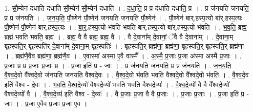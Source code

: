 \documentclass[17pt]{extarticle}
\begin{document}
1. सौ॒म्येन॑ दधाति दधाति सौ॒म्येन॑ सौ॒म्येन॑ दधाति । . द॒धा॒ति॒ प्र प्र द॑धाति दधाति॒ प्र । . प्र ज॑नयति जनयति॒ प्र प्र ज॑नयति । . ज॒न॒य॒ति॒ पौ॒ष्णेन॑ पौ॒ष्णेन॑ जनयति जनयति पौ॒ष्णेन॑ । . पौ॒ष्णेन॑ बार्.हस्प॒त्यो बा॑र्.हस्प॒त्यः पौ॒ष्णेन॑ पौ॒ष्णेन॑ बार्.हस्प॒त्यः । . बा॒र्॒.ह॒स्प॒त्यो भ॑वति भवति बार्.हस्प॒त्यो बा॑र्.हस्प॒त्यो भ॑वति । . भ॒व॒ति॒ ब्रह्म॒ ब्रह्म॑ भवति भवति॒ ब्रह्म॑ । . ब्रह्म॒ वै वै ब्रह्म॒ ब्रह्म॒ वै । . वै दे॒वाना᳚म् दे॒वानां॒ ॅवै वै दे॒वाना᳚म् । . दे॒वाना॒म् बृह॒स्पति॒र् बृह॒स्पति॑र् दे॒वाना᳚म् दे॒वाना॒म् बृह॒स्पतिः॑ । . बृह॒स्पति॒र् ब्रह्म॑णा॒ ब्रह्म॑णा॒ बृह॒स्पति॒र् बृह॒स्पति॒र् ब्रह्म॑णा । . ब्रह्म॑णै॒वैव ब्रह्म॑णा॒ ब्रह्म॑णै॒व । . ए॒वास्मा॑ अस्मा ए॒वै वास्मै᳚ । . अ॒स्मै॒ प्र॒जाः प्र॒जा अ॑स्मा अस्मै प्र॒जाः । . प्र॒जाः प्र प्र प्र॒जाः प्र॒जाः प्र । . प्र॒जा इति॑ प्र - जाः । . प्र ज॑नयति जनयति॒ प्र प्र ज॑नयति । . ज॒न॒य॒ति॒ वै॒श्व॒दे॒वो वै᳚श्वदे॒वो ज॑नयति जनयति वैश्वदे॒वः । . वै॒श्व॒दे॒वो भ॑वति भवति वैश्वदे॒वो वै᳚श्वदे॒वो भ॑वति । . वै॒श्व॒दे॒व इति॑ वैश्व - दे॒वः । . भ॒व॒ति॒ वै॒श्व॒दे॒व्यो॑ वैश्वदे॒व्यो॑ भवति भवति वैश्वदे॒व्यः॑ । . वै॒श्व॒दे॒व्यो॑ वै वै वै᳚श्वदे॒व्यो॑ वैश्वदे॒व्यो॑ वै । . वै॒श्व॒दे॒व्य॑ इति॑ वैश्व - दे॒व्यः॑ । . वै प्र॒जाः प्र॒जा वै वै प्र॒जाः । . प्र॒जाः प्र॒जाः । . प्र॒जा इति॑ प्र - जाः । . प्र॒जा ए॒वैव प्र॒जाः प्र॒जा ए॒व । \newline
\end{document}

